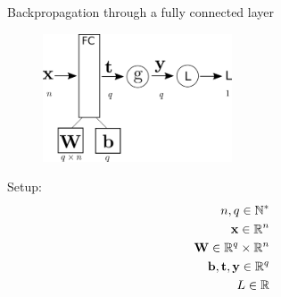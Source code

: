 \documentclass[xcolor=pdftex,dvipsnames,table,mathserif]{beamer}
\begin{document}













\begin{frame}{Backpropagation through a fully connected layer}
\begin{figure}
\includegraphics[width=0.5\textwidth]{../graphics/bp_fc.png}
\end{figure}

Setup:
\begin{eqnarray*}
n, q \in \mathbb{N}^*\\
\mathbf{x} \in \mathbb{R}^n \\
\mathbf{W} \in \mathbb{R}^q \times \mathbb{R}^n \\
\mathbf{b}, \mathbf{t}, \mathbf{y} \in \mathbb{R}^q \\
L \in \mathbb{R}
\end{eqnarray*}

\end{frame}
\end{document}
